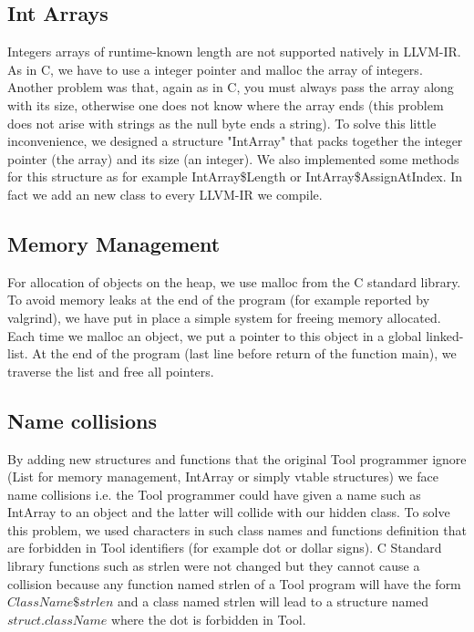 \subsection{Int Arrays}
Integers arrays of runtime-known length are not supported natively in LLVM-IR. As in C, we have to use a integer pointer and malloc the array of integers. Another problem was that, again as in C, you must always pass the array along with its size, otherwise one does not know where the array ends (this problem does not arise with strings as the null byte ends a string). To solve this little inconvenience, we designed a structure "IntArray" that packs together the integer pointer (the array) and its size (an integer). We also implemented some methods for this structure as for example IntArray\$Length or IntArray\$AssignAtIndex. In fact we add an new class to every LLVM-IR we compile.

\subsection{Memory Management}
For allocation of objects on the heap, we use malloc from the C standard library.
To avoid memory leaks at the end of the program (for example reported by valgrind), we have put in place a simple system for freeing memory allocated. Each time we malloc an object, we put a pointer to this object in a global linked-list. At the end of the program (last line before return of the function main), we traverse the list and free all pointers.

\subsection{Name collisions}
By adding new structures and functions that the original Tool programmer ignore (List for memory management, IntArray or simply vtable structures) we face name collisions i.e. the Tool programmer could have given a name such as IntArray to an object and the latter will collide with our hidden class. To solve this problem, we used characters in such class names and functions definition that are forbidden in Tool identifiers (for example dot or dollar signs). C Standard library functions such as strlen were not changed but they cannot cause a collision because any function named strlen of a Tool program will have the form $ClassName\$strlen$ and a class named strlen will lead to a structure named $struct.className$ where the dot is forbidden in Tool.